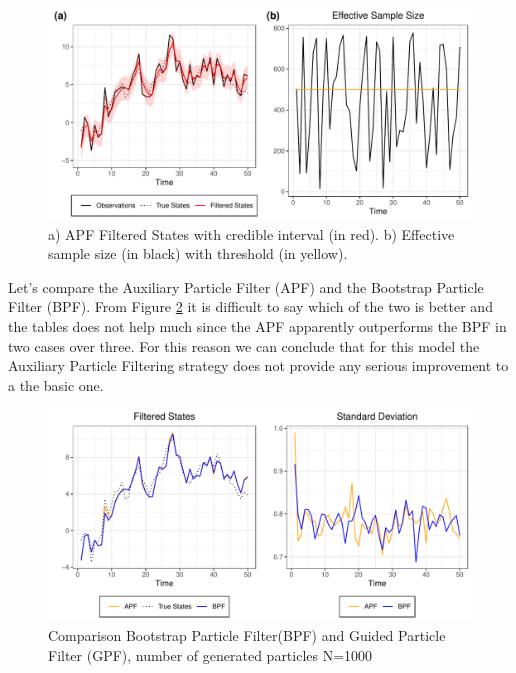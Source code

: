 \documentclass[
]{book}
\theoremstyle{break}
\theoremstyle{nonumberplain}
\begin{document}
\begin{figure}[H]

{\centering \includegraphics{prova_knit_finale_files/figure-latex/unnamed-chunk-20-1} 

}

\caption{a) APF Filtered States with credible interval (in red). b) Effective sample size (in black) with threshold (in yellow).}\label{fig:unnamed-chunk-20}
\end{figure}

Let's compare the Auxiliary Particle Filter (APF) and the Bootstrap
Particle Filter (BPF). From Figure \ref{fig:myfig6} it is difficult to
say which of the two is better and the tables does not help much since
the APF apparently outperforms the BPF in two cases over three. For this
reason we can conclude that for this model the Auxiliary Particle
Filtering strategy does not provide any serious improvement to a the
basic one.

\begin{figure}[H]

{\centering \includegraphics{prova_knit_finale_files/figure-latex/myfig6-1} 

}

\caption{Comparison Bootstrap Particle Filter(BPF) and Guided Particle Filter (GPF), number of generated particles N=1000}\label{fig:myfig6}
\end{figure}
\end{document}
